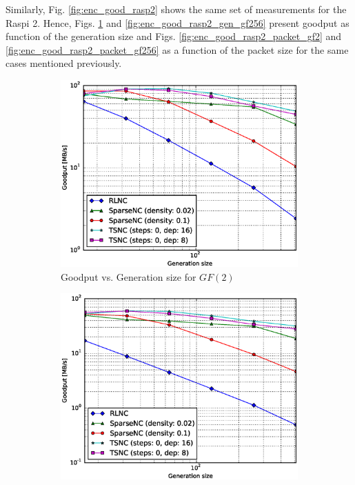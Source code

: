 Similarly, Fig. \ref{fig:enc_good_rasp2} shows the same set of
measurements for the \ac{Raspi} 2. Hence, Figs. \ref{fig:enc_good_rasp2_gen_gf2}
and \ref{fig:enc_good_rasp2_gen_gf256} present goodput as function of the
generation size  and Figs. \ref{fig:enc_good_rasp2_packet_gf2} and 
\ref{fig:enc_good_rasp2_packet_gf256} as a function of the packet size for the
same cases mentioned previously.

\begin{figure}
    \centering
    \begin{subfigure}[b]{0.475\textwidth}
        \centering
        \includegraphics[width=1.15\textwidth]{images/23_07_2015/goodput_vs_generation_size_Rasp_v2_encoder_Binary_1600.eps}
        \caption[]%
        {{\small Goodput vs. Generation size for $GF(2)$}}    
        \label{fig:enc_good_rasp2_gen_gf2}
    \end{subfigure}
    \hfill
    \begin{subfigure}[b]{0.475\textwidth}  
        \centering 
        \includegraphics[width=1.15\textwidth]{images/23_07_2015/goodput_vs_generation_size_Rasp_v2_encoder_Binary8_1600.eps}

\end{subfigure}
\end{figure}
